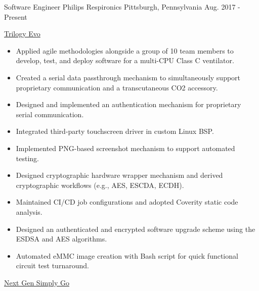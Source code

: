 

\begin{cventries}

\cventry
  {Software Engineer} %
  {Philips Respironics} %
  {Pittsburgh, Pennsylvania} %
  {Aug. 2017 - Present} %
  {
    \begin{cvitems}
    \item
    {
      \href{https://www.usa.philips.com/healthcare/product/HC0055500/trilogy-evo-portable-hospital-to-home-ventilator}{\color{RoyalBlue}Trilogy Evo}
      \begin{itemize}
        \item Applied agile methodologies alongside a group of 10 team members to develop, test, and deploy software for a multi-CPU Class C ventilator.
        \item Created a serial data passthrough mechanism to simultaneously support proprietary communication and a transcutaneous CO2 accessory.
        \item Designed and implemented an authentication mechanism for proprietary serial communication.
        \item Integrated third-party touchscreen driver in custom Linux BSP.
        \item Implemented PNG-based screenshot mechanism to support automated testing.
        \item Designed cryptographic hardware wrapper mechanism and derived cryptographic workflows (e.g., AES, ESCDA, ECDH).
        \item Maintained CI/CD job configurations and adopted Coverity static code analysis.
        \item Designed an authenticated and encrypted software upgrade scheme using the ESDSA and AES algorithms.
        \item Automated eMMC image creation with Bash script for quick functional circuit test turnaround.
      \end{itemize}
    }
    \item
    {
      \href{https://www.usa.philips.com/healthcare/product/HCNOCTN350/simplygo-mini-portable-oxygen-concentrator-poc}{\color{RoyalBlue}Next Gen Simply Go}
}
\end{cvitems}}
\end{cventries}
